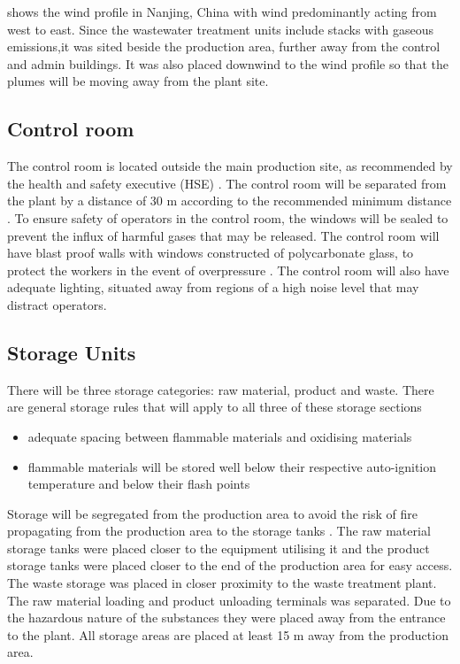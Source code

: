 { shows the wind profile in Nanjing, China with wind predominantly acting from west to east. Since the wastewater treatment units include stacks with gaseous emissions,it was sited beside the production area, further away from the control and admin buildings. It was also placed downwind to the wind profile so that the plumes will be moving away from the plant site. 

\subsection{Control room}

The control room is located outside the main production site, as recommended by the health and safety executive (HSE) \cite{health_and_safety_executive_control_nodate}. The control room will be separated from the plant by a distance of 30 m according to the recommended minimum distance \cite{mannan_lees_2012}. To ensure safety of operators in the control room, the windows will be sealed to prevent the influx of harmful gases that may be released. The control room will have blast proof walls with windows constructed of polycarbonate glass, to protect the workers in the event of overpressure \cite{health_and_safety_executive_control_nodate}. The control room will also have adequate lighting, situated away from regions of a high noise level that may distract operators.

\subsection{Storage Units}

There will be three storage categories: raw material, product and waste. There are general storage rules that will apply to all three of these storage sections 

\begin{itemize}
    \item adequate spacing between flammable materials and oxidising materials 
    \item flammable materials will be stored well below their respective auto-ignition temperature and below their flash points
\end{itemize}

Storage will be segregated from the production area to avoid the risk of fire propagating from the production area to the storage tanks \cite{mannan_lees_2012}. The raw material storage tanks were placed closer to the equipment utilising it and the product storage tanks were placed closer to the end of the production area for easy access. The waste storage was placed in closer proximity to the waste treatment plant. The raw material loading and product unloading terminals was separated. Due to the hazardous nature of the substances they were placed away from the entrance to the plant. All storage areas are placed at least 15 m away from the production area. 

}
